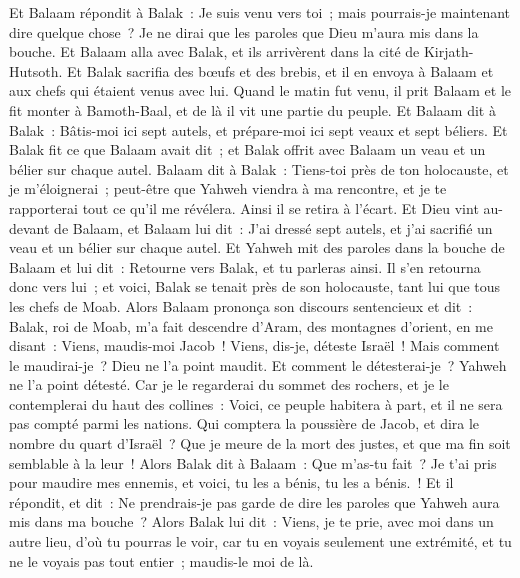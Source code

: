\begin{multicols}{2}
Et Balaam répondit à Balak~: Je suis venu vers toi~; mais pourrais-je maintenant dire quelque chose~? Je ne dirai que les paroles que Dieu m'aura mis dans la bouche.
Et Balaam alla avec Balak, et ils arrivèrent dans la cité de Kirjath-Hutsoth.
Et Balak sacrifia des bœufs et des brebis, et il en envoya à Balaam et aux chefs qui étaient venus avec lui.
Quand le matin fut venu, il prit Balaam et le fit monter à Bamoth-Baal, et de là il vit une partie du peuple.
\VerseOne{}Et Balaam dit à Balak~: Bâtis-moi ici sept autels, et prépare-moi ici sept veaux et sept béliers.
Et Balak fit ce que Balaam avait dit~; et Balak offrit avec Balaam un veau et un bélier sur chaque autel.
Balaam dit à Balak~: Tiens-toi près de ton holocauste, et je m'éloignerai~; peut-être que Yahweh viendra à ma rencontre, et je te rapporterai tout ce qu'il me révélera. Ainsi il se retira à l'écart.
Et Dieu vint au-devant de Balaam, et Balaam lui dit~: J'ai dressé sept autels, et j'ai sacrifié un veau et un bélier sur chaque autel.
Et Yahweh mit des paroles dans la bouche de Balaam et lui dit~: Retourne vers Balak, et tu parleras ainsi.
Il s'en retourna donc vers lui~; et voici, Balak se tenait près de son holocauste, tant lui que tous les chefs de Moab.
Alors Balaam prononça son discours sentencieux et dit~: Balak, roi de Moab, m'a fait descendre d'Aram, des montagnes d'orient, en me disant~: Viens, maudis-moi Jacob~! Viens, dis-je, déteste Israël~!
Mais comment le maudirai-je~? Dieu ne l'a point maudit. Et comment le détesterai-je~? Yahweh ne l'a point détesté.
Car je le regarderai du sommet des rochers, et je le contemplerai du haut des collines~: Voici, ce peuple habitera à part, et il ne sera pas compté parmi les nations.
Qui comptera la poussière de Jacob, et dira le nombre du quart d'Israël~? Que je meure de la mort des justes, et que ma fin soit semblable à la leur~!
Alors Balak dit à Balaam~: Que m'as-tu fait~? Je t'ai pris pour maudire mes ennemis, et voici, tu les a bénis, tu les a bénis.~!
Et il répondit, et dit~: Ne prendrais-je pas garde de dire les paroles que Yahweh aura mis dans ma bouche~?
Alors Balak lui dit~: Viens, je te prie, avec moi dans un autre lieu, d'où tu pourras le voir, car tu en voyais seulement une extrémité, et tu ne le voyais pas tout entier~; maudis-le moi de là.

\end{multicols}
